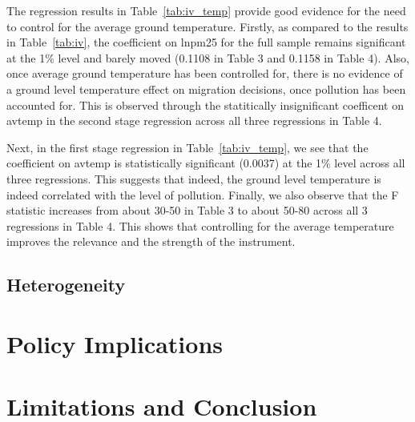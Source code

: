 \documentclass[11pt,twocolumn]{article}
\begin{document}
The regression results in Table~\ref{tab:iv_temp} provide good evidence for the need to control for the average ground temperature. Firstly, as compared to the results in Table~\ref{tab:iv}, the coefficient on lnpm25 for the full sample remains significant at the 1\% level and barely moved (0.1108 in Table 3 and 0.1158 in Table 4). Also, once average ground temperature has been controlled for, there is no evidence of a ground level temperature effect on migration decisions, once pollution has been accounted for. This is observed through the statitically insignificant coefficent on avtemp in the second stage regression across all three regressions in Table 4.

Next, in the first stage regression in Table~\ref{tab:iv_temp}, we see that the coefficient on avtemp is statistically significant (0.0037) at the 1\% level across all three regressions. This suggests that indeed, the ground level temperature is indeed correlated with the level of pollution. Finally, we also observe that the F statistic increases from about 30-50 in Table 3 to about 50-80 across all 3 regressions in Table 4. This shows that controlling for the average temperature improves the relevance and the strength of the instrument. 

\subsection{Heterogeneity}



\lipsum[1]

\section{Policy Implications}

\lipsum[1]

\section{Limitations and Conclusion}

\lipsum[1]


\end{document}
